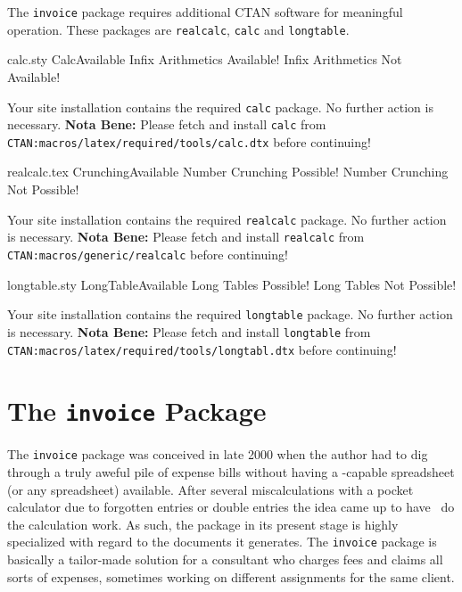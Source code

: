 \documentclass[11pt]{ltxdoc}
\begin{document}
	\begin{sloppy}
	The \texttt{invoice} package requires additional CTAN
	software for meaningful operation. These packages are
	\texttt{realcalc}, \texttt{calc} and \texttt{longtable}.

	\PackageDiagnostics%
	{calc.sty}				%
	{CalcAvailable}				%
	{Infix Arithmetics Available!}		%
	{Infix Arithmetics Not Available!}	%

	\ifnum{}
		Your site installation contains the required \texttt{calc}
		package. No further action is necessary.
	\else
		\textbf{Nota Bene:} Please fetch and install \texttt{calc}
		from
		\texttt{CTAN:macros/latex/required/tools/calc.dtx} before
		continuing!
	\fi

	\PackageDiagnostics%
	{realcalc.tex}				%
	{CrunchingAvailable}			%
	{Number Crunching Possible!}		%
	{Number Crunching Not Possible!}	%

	\ifnum{}
		Your site installation contains the required
		\texttt{realcalc}
		package. No further action is necessary.
	\else
		\textbf{Nota Bene:} Please fetch and install \texttt{realcalc}
		from \texttt{CTAN:macros/generic/realcalc} before continuing!
	\fi

	\PackageDiagnostics%
	{longtable.sty}				%
	{LongTableAvailable}			%
	{Long Tables Possible!}			%
	{Long Tables Not Possible!}		%

	\ifnum{}
		Your site installation contains the required
		\texttt{longtable}
		package. No further action is necessary.
	\else
		\textbf{Nota Bene:} Please fetch and install \texttt{longtable}
		from \texttt{CTAN:macros/latex/required/tools/longtabl.dtx}
		before continuing!
	\fi

	\addtocounter{AllInPlace}{\theCalcAvailable}
	\addtocounter{AllInPlace}{\theCrunchingAvailable}
	\addtocounter{AllInPlace}{\theLongTableAvailable}

	\ifnum{}
		\section{The \texttt{invoice} Package}

		The \texttt{invoice} package was conceived in late 2000
		when the author had to dig through a truly aweful pile
		of expense bills without having a \LaTeXe-capable
		spreadsheet (or any spreadsheet) available. After several
		miscalculations with a pocket calculator due to forgotten
		entries or double entries the idea came up to have \LaTeXe\
		do the calculation work. As such, the package in its present
		stage is highly specialized with regard to the documents it
		generates. The \texttt{invoice} package is basically a
		tailor-made solution for a consultant who charges fees and
		claims all sorts of expenses, sometimes working on different
		assignments for the same client.


\end{sloppy}
\end{document}
